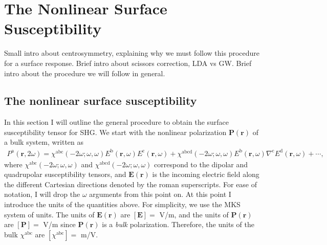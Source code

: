 \chapter{The Nonlinear Surface Susceptibility}\label{chap:chi2}
\partialtoc

{\color{red} Small intro about centrosymmetry, explaining why we must follow
this procedure for a surface response. Brief intro about scissors correction,
LDA vs GW. Brief intro about the procedure we will follow in general.}

\section{The nonlinear surface susceptibility}

In this section I will outline the general procedure to obtain the surface
susceptibility tensor for SHG. We start with the nonlinear polarization
$\mathbf{P}(\mathbf{r})$ of a bulk system, written as
\begin{equation}\label{mshg}
\begin{split}
P^{\mathrm{a}}(\mathbf{r},2\omega)
= \chi^{\mathrm{abc}}(-2\omega;\omega,\omega)
  E^{\mathrm{b}}(\mathbf{r},\omega)E^{\mathrm{c}}(\mathbf{r},\omega)
+ \chi^{\mathrm{abcd}}(-2\omega;\omega,\omega)
  E^{\mathrm{b}}(\mathbf{r},\omega)\nabla^{\mathrm{c}}
  E^{\mathrm{d}}(\mathbf{r},\omega)
+ \cdots,
\end{split}
\end{equation}
where $\chi^{\mathrm{abc}}(-2\omega;\omega,\omega)$ and
$\chi^{\mathrm{abcd}}(-2\omega;\omega,\omega)$ correspond to the dipolar and
quadrupolar susceptibility tensors, and $\mathbf{E}(\mathbf{r})$ is the incoming
electric field along the different Cartesian directions denoted by the roman
superscripts. For ease of notation, I will drop the $\omega$ arguments from this
point on.
At this point I introduce the units of the quantities above. For simplicity, we
use the MKS system of units. The units of $\mathbf{E}(\mathbf{r})$ are
$[\mathbf{E}] = $ V/m, and the units of $\mathbf{P}(\mathbf{r})$ are
$[\mathbf{P}] = $ V/m since $\mathbf{P}(\mathbf{r})$ is a \emph{bulk}
polarization. Therefore, the units of the bulk $\chi^{\mathrm{abc}}$ are
$[\chi^{\mathrm{abc}}] = $ m/V.

